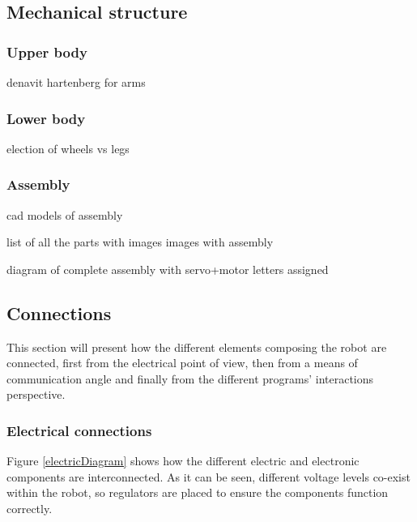 \subsection{Mechanical structure}
\subsubsection{Upper body}
denavit hartenberg for arms

\subsubsection{Lower body}
election of wheels vs legs

\subsubsection{Assembly}
cad models of assembly

list of all the parts with images
images with assembly 

diagram of complete assembly with servo+motor letters assigned















\subsection{Connections}

This section will present how the different elements composing the robot are connected, first from the electrical point of view, then from a means of communication angle and finally from the different programs' interactions perspective.




\subsubsection{Electrical connections}

Figure \ref{electricDiagram} shows how the different electric and electronic components are interconnected.  As it can be seen, different voltage levels co-exist within the robot, so regulators are placed to ensure the components function correctly. \\

